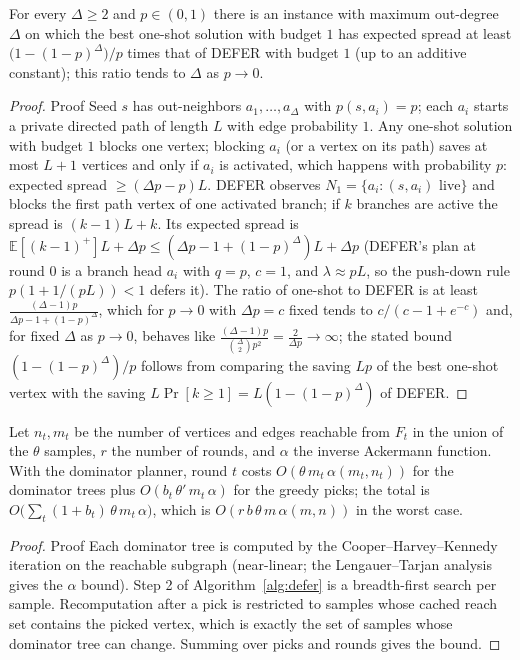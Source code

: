 \documentclass[ijoc,sglanonrev]{informs4}
\begin{document}
\begin{repeattheorem}
For every $\Delta\ge 2$ and $p\in(0,1)$ there is an instance with maximum
out-degree $\Delta$ on which the best one-shot solution with budget $1$ has
expected spread at least $\bigl(1-(1-p)^{\Delta}\bigr)/p$ times that of
DEFER with budget $1$ (up to an additive constant); this ratio tends to
$\Delta$ as $p\to 0$.
\end{repeattheorem}
\begin{proof}{Proof}
Seed $s$ has out-neighbors $a_1,\dots,a_\Delta$ with $p(s,a_i)=p$; each
$a_i$ starts a private directed path of length $L$ with edge probability
$1$. Any one-shot solution with budget $1$ blocks one vertex; blocking
$a_i$ (or a vertex on its path) saves at most $L+1$ vertices and only if
$a_i$ is activated, which happens with probability $p$: expected spread
$\ge(\Delta p-p)L$. DEFER observes $N_1=\{a_i:(s,a_i)\text{ live}\}$ and
blocks the first path vertex of one activated branch; if $k$ branches are
active the spread is $(k-1)L+k$. Its expected spread is
$\mathbb E[(k-1)^+]L+\Delta p\le(\Delta p-1+(1-p)^\Delta)L+\Delta p$ (DEFER's
plan at round $0$ is a branch head $a_i$ with $q=p$, $c=1$, and
$\lambda\approx pL$, so the push-down rule $p(1+1/(pL))<1$ defers it). The
ratio of one-shot to DEFER is at least
$\frac{(\Delta-1)p}{\Delta p-1+(1-p)^\Delta}$, which for $p\to0$ with
$\Delta p=c$ fixed tends to $c/(c-1+e^{-c})$ and, for fixed $\Delta$ as
$p\to0$, behaves like $\frac{(\Delta-1)p}{\binom{\Delta}{2}p^2}=
\frac{2}{\Delta p}\to\infty$; the stated bound
$(1-(1-p)^\Delta)/p$ follows from comparing the saving $Lp$ of the best
one-shot vertex with the saving $L\Pr[k\ge1]=L(1-(1-p)^\Delta)$ of
DEFER.\Halmos
\end{proof}

\begin{repeattheorem}
Let $n_t,m_t$ be the number of vertices and edges reachable from $F_t$ in
the union of the $\theta$ samples, $r$ the number of rounds, and $\alpha$
the inverse Ackermann function. With the dominator planner, round $t$
costs $O(\theta\,m_t\,\alpha(m_t,n_t))$ for the dominator trees plus
$O(b_t\,\theta'\,m_t\,\alpha)$ for the greedy picks; the total is
$O\bigl(\sum_t(1+b_t)\,\theta\,m_t\,\alpha\bigr)$, which is
$O(r\,b\,\theta\,m\,\alpha(m,n))$ in the worst case.
\end{repeattheorem}
\begin{proof}{Proof}
Each dominator tree is computed by the Cooper--Harvey--Kennedy iteration
on the reachable subgraph (near-linear; the Lengauer--Tarjan analysis gives
the $\alpha$ bound). Step 2 of Algorithm~\ref{alg:defer} is a breadth-first
search per sample. Recomputation after a pick is restricted to samples
whose cached reach set contains the picked vertex, which is exactly the
set of samples whose dominator tree can change. Summing over picks and
rounds gives the bound.\Halmos
\end{proof}
\end{document}
